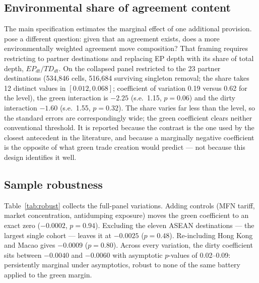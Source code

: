 \documentclass[12pt]{article}
\begin{document}
\subsection{Environmental share of agreement content}

The main specification estimates the marginal effect of one additional provision.
\citet{abman2024} pose a different question: given that an agreement exists, does a more
environmentally weighted agreement move composition? That framing requires restricting to
partner destinations and replacing EP depth with its share of total depth,
$EP_{dt}/TD_{dt}$. On the collapsed panel restricted to the 23 partner destinations
(534{,}846 cells, 516{,}684 surviving singleton removal; the share takes 12 distinct values
in $[0.012, 0.068]$; coefficient of variation 0.19 versus 0.62 for the level), the green
interaction is $-2.25$ (s.e.\ 1.15, $p = 0.06$) and the dirty interaction $-1.60$
(s.e.\ 1.55, $p = 0.32$). The share varies far less than the level, so the standard
errors are correspondingly wide; the green coefficient clears neither conventional
threshold. It is reported because the contrast is the one used by the closest antecedent
in the literature, and because a marginally negative coefficient is the opposite of what
green trade creation would predict --- not because this design identifies it well.

\subsection{Sample robustness}

Table~\ref{tab:robust} collects the full-panel variations. Adding controls (MFN tariff,
market concentration, antidumping exposure) moves the green coefficient to an exact zero
($-0.0002$, $p = 0.94$). Excluding the eleven ASEAN destinations --- the largest single
cohort --- leaves it at $-0.0025$ ($p = 0.48$). Re-including Hong Kong and Macao gives
$-0.0009$ ($p = 0.80$). Across every variation, the dirty coefficient sits between
$-0.0040$ and $-0.0060$ with asymptotic $p$-values of 0.02--0.09: persistently marginal
under asymptotics, robust to none of the same battery applied to the green margin.

\begin{table}[htbp]
\centering
\caption{Sample robustness (full firm-level panel, WB index)}
\label{tab:robust}

\end{table}
\end{document}
